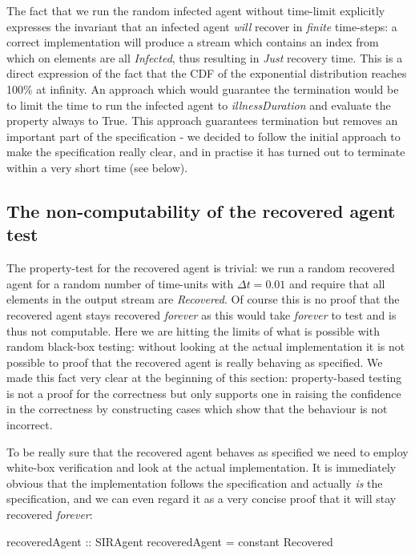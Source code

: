 The fact that we run the random infected agent without time-limit explicitly expresses the invariant that an infected agent \textit{will} recover in \textit{finite} time-steps: a correct implementation will produce a stream which contains an index from which on elements are all \textit{Infected}, thus resulting in \textit{Just} recovery time. This is a direct expression of the fact that the CDF of the exponential distribution reaches 100\% at infinity. An approach which would guarantee the termination would be to limit the time to run the infected agent to \textit{illnessDuration} and evaluate the property always to True. This approach guarantees termination but removes an important part of the specification - we decided to follow the initial approach to make the specification really clear, and in practise it has turned out to terminate within a very short time (see below).

\subsection{The non-computability of the recovered agent test}
The property-test for the recovered agent is trivial: we run a random recovered agent for a random number of time-units with $\Delta t = 0.01$ and require that all elements in the output stream are \textit{Recovered}. Of course this is no proof that the recovered agent stays recovered \textit{forever} as this would take \textit{forever} to test and is thus not computable.  Here we are hitting the limits of what is possible with random black-box testing: without looking at the actual implementation it is not possible to proof that the recovered agent is really behaving as specified. We made this fact very clear at the beginning of this section: property-based testing is not a proof for the correctness but only supports one in raising the confidence in the correctness by constructing cases which show that the behaviour is not incorrect.

To be really sure that the recovered agent behaves as specified we need to employ white-box verification and look at the actual implementation. It is immediately obvious that the implementation follows the specification and actually \textit{is} the specification, and we can even regard it as a very concise proof that it will stay recovered \textit{forever}:

\begin{HaskellCode}
recoveredAgent :: SIRAgent
recoveredAgent = constant Recovered
\end{HaskellCode}

